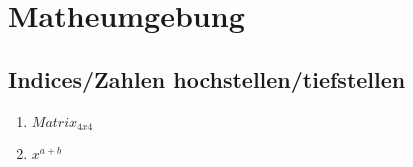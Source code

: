 \chapter{Matheumgebung}

\section{Indices/Zahlen hochstellen/tiefstellen}

\begin{enumerate}
 \item $Matrix_{4x4}$
 \item $x^{a + b}$
\end{enumerate}

